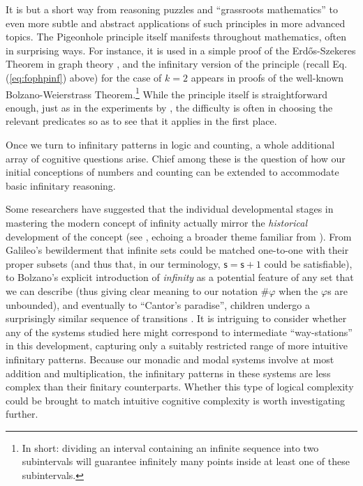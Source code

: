 \documentclass[12pt,oneside,reqno]{amsart}
\theoremstyle{definition}
\begin{document}
It is but a short way from reasoning puzzles and ``grassroots mathematics'' to even more subtle and abstract applications of such principles in more advanced topics. The Pigeonhole principle itself manifests throughout mathematics, often in surprising ways. %
For instance, it is used in a simple proof of the Erd\H{o}s-Szekeres Theorem in graph theory \citep{Seidenberg1}, and the infinitary version of the principle (recall Eq. (\ref{eq:fophpinf}) above) for the case of $k=2$ appears in proofs of the well-known Bolzano-Weierstrass Theorem.\footnote{In short: dividing an interval containing an infinite sequence into two subintervals will guarantee infinitely many points inside at least one of these subintervals.} While the principle itself is straightforward enough, just as in the experiments by \cite{Sperber}, the difficulty is often in choosing the relevant predicates so as to see that it applies in the first place.


Once we turn to infinitary patterns in logic and counting, a whole additional array of cognitive questions arise. Chief among these is the question of how our initial conceptions of numbers and counting can be extended to accommodate basic infinitary reasoning. 


Some researchers have suggested that the individual developmental stages in mastering the modern concept of infinity actually mirror the \emph{historical} development of the concept (see \citealt{MathEdu}, echoing a broader theme familiar from \citealt{PiagetGarcia}). From Galileo's bewilderment that infinite sets could be matched one-to-one with their proper subsets (and thus that, in our terminology, $\mathsf{s}=\mathsf{s}+1$ could be satisfiable), to Bolzano's explicit introduction of \emph{infinity} as a potential feature of any set that we can describe (thus giving clear meaning to our notation $\#\varphi$ when the $\varphi$s are unbounded), and eventually to ``Cantor's paradise'', children undergo a surprisingly similar sequence of transitions \citep{MathEdu}. It is intriguing to consider whether any of the systems studied here might correspond to intermediate ``way-stations'' in this development, capturing only a suitably restricted range of more intuitive infinitary patterns. Because our monadic and modal systems involve at most addition and multiplication, the infinitary patterns in these systems are less complex than their finitary counterparts. Whether this type of logical complexity could be brought to match intuitive cognitive complexity is worth investigating further. 
\end{document}
